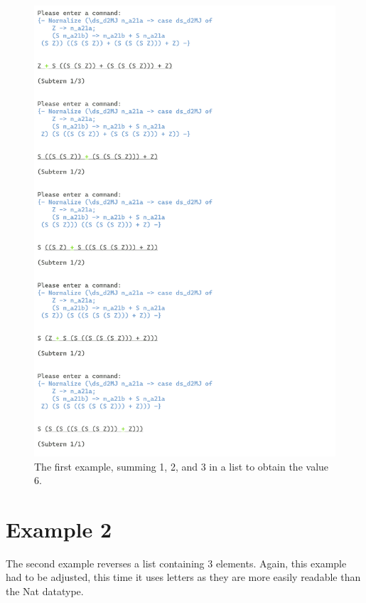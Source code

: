 \begin{figure}
    \includegraphics[width=1\textwidth]{resources/sum_part_2.PNG}
    \caption{The first example, summing 1, 2, and 3 in a list to obtain the value 6.}
\end{figure}

\clearpage
\section{Example 2}
The second example reverses a list containing 3 elements.
Again, this example had to be adjusted, this time it uses letters as they are more easily readable than the Nat datatype.

